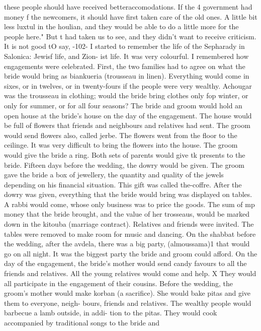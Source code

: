 {{these people should have received betteraccomodations. If the 4 government had money f 
the newcomers, it should have first taken care of the old ones. A little bit less luxtul 
in the houlian, and they would be able to do a little more for the people here." But t 
had taken us to see, and they didn't want to receive criticism. It is not good tO 
say, 
-102- 
I started to remember the life of the Sepharady in Salonica: Jewisf life, and Zion-
ist life. It was very colourful. I remembered how engagements were celebrated. First, 
the two families had to agree on what the bride would bring as biankueria (trousseau in 
linen). Everything would come in sixes, or in twelves, or in twenty-fours if the people 
were very wealthy. Achougar was the trousseau in clothing; would the bride bring clothes 
only fop winter, or only for summer, or for all four seasons? The bride and groom would 
hold an open house at the bride's house on the day of the engagement. The house would be 
full of flowers that friends and neighbours and relatives had sent. The groom would send 
flowers also, called jerbe. The flowers went from the floor to the ceilinge. It was 
very difficult to bring the flowers into the house. The groom would give the bride a 
ring. Both sets of parents would give tk presents to the bride. 
Fifteen days before the wedding, the dowry would be given. The groom gave the bride 
a box of jewellery, the quantity and quality of the jewels depending on his financial 
situation. This gift was called the-coffre. After the dowry was given, everything that 
the bride would bring was displayed on tables. A rabbi would come, whose only business 
was to price the goods. The sum of mp money that the bride brought, and the value of her 
trosseaus, would be marked down in the kitouba (marriage contract). 
Relatives and friends were invited. The tables were removed to make room for music 
and dancing. On the shabbat before the wedding, after the avdela, there was a big party, 
(almoussama)1 that would go on all night. It was the biggest party the bride and groom 
could afford. 
On the day of the engagement, the bride's mother would send candy favours to all the 
friends and relatives. All the young relatives would come and help. X They would all 
participate in the engagement of their cousins. Before the wedding, the groom's mother 
would make korban (a sacrifice). She would bake pitas and give them to everyone, neigh-
bours, friends and relatives. The wealthy people would barbecue a lamb outside, in addi-
tion to the pitas. They would cook accompanied by traditional songs to the bride and 
}}
